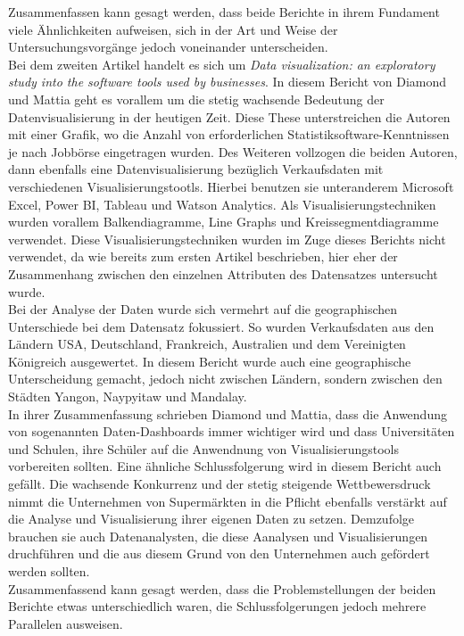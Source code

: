 \documentclass[usegeometry=true]{scrartcl}
\begin{document}
Zusammenfassen kann gesagt werden, dass beide Berichte in ihrem Fundament viele Ähnlichkeiten aufweisen, sich in der Art und Weise der Untersuchungsvorgänge jedoch voneinander
unterscheiden.\\
\noindent Bei dem zweiten Artikel handelt es sich um \textit{Data visualization: an exploratory study into the software tools used by businesses}.\cite{diamond2017data}
In diesem Bericht von Diamond und Mattia geht es vorallem um die stetig wachsende Bedeutung der Datenvisualisierung in der heutigen Zeit. Diese These unterstreichen die Autoren
mit einer Grafik, wo die Anzahl von erforderlichen Statistiksoftware-Kenntnissen je nach Jobbörse eingetragen wurden. Des Weiteren vollzogen die beiden Autoren, dann ebenfalls
eine Datenvisualisierung bezüglich Verkaufsdaten mit verschiedenen Visualisierungstootls. Hierbei benutzen sie unteranderem Microsoft Excel, Power BI, Tableau und
Watson Analytics. Als Visualisierungstechniken wurden vorallem Balkendiagramme, Line Graphs und Kreissegmentdiagramme verwendet. Diese Visualisierungstechniken wurden im Zuge
dieses Berichts nicht verwendet, da wie bereits zum ersten Artikel beschrieben, hier eher der Zusammenhang zwischen den einzelnen Attributen des Datensatzes untersucht wurde.\\
Bei der Analyse der Daten wurde sich vermehrt auf die geographischen Unterschiede bei dem Datensatz fokussiert. So wurden Verkaufsdaten aus den Ländern USA, Deutschland,
Frankreich, Australien und dem Vereinigten Königreich ausgewertet. In diesem Bericht wurde auch eine geographische Unterscheidung gemacht, jedoch nicht zwischen Ländern,
sondern zwischen den Städten Yangon, Naypyitaw und Mandalay.
\\ In ihrer Zusammenfassung schrieben Diamond und Mattia, dass die Anwendung von sogenannten Daten-Dashboards immer wichtiger wird und dass Universitäten und Schulen, ihre Schüler
auf die Anwendnung von Visualisierungstools vorbereiten sollten. Eine ähnliche Schlussfolgerung wird in diesem Bericht auch gefällt. Die wachsende Konkurrenz und der stetig steigende
Wettbewersdruck nimmt die Unternehmen von Supermärkten in die Pflicht ebenfalls verstärkt auf die Analyse und Visualisierung ihrer eigenen Daten zu setzen. Demzufolge brauchen
sie auch Datenanalysten, die diese Aanalysen und Visualisierungen druchführen und die aus diesem Grund von den Unternehmen auch gefördert werden sollten.\\
Zusammenfassend kann gesagt werden, dass die Problemstellungen der beiden Berichte etwas unterschiedlich waren, die Schlussfolgerungen jedoch mehrere Parallelen ausweisen.  



\printbibliography
\end{document}
